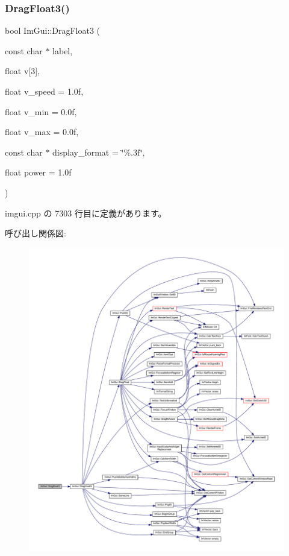 \subsubsection{\texorpdfstring{Drag\+Float3()}{DragFloat3()}}
{\footnotesize\ttfamily bool Im\+Gui\+::\+Drag\+Float3 (\begin{DoxyParamCaption}\item[{const char $\ast$}]{label,  }\item[{float}]{v\mbox{[}3\mbox{]},  }\item[{float}]{v\+\_\+speed = {\ttfamily 1.0f},  }\item[{float}]{v\+\_\+min = {\ttfamily 0.0f},  }\item[{float}]{v\+\_\+max = {\ttfamily 0.0f},  }\item[{const char $\ast$}]{display\+\_\+format = {\ttfamily \char`\"{}\%.3f\char`\"{}},  }\item[{float}]{power = {\ttfamily 1.0f} }\end{DoxyParamCaption})}



 imgui.\+cpp の 7303 行目に定義があります。

呼び出し関係図\+:\nopagebreak
\begin{figure}[H]
\begin{center}
\leavevmode
\includegraphics[width=350pt]{namespace_im_gui_a3a365703646c6fb5357f21a13c531bfe_cgraph}
\end{center}
\end{figure}
\mbox{\label{namespace_im_gui_a6dfd9e5d7adc6106e9391fc971d2f8bc}} 
